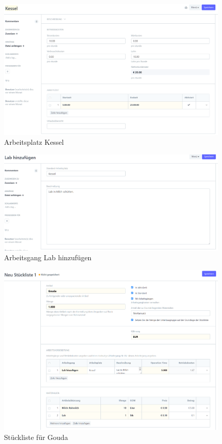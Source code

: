 \begin{figure}[H]
  \centering
  \includegraphics[width=\textwidth]{Bilder/Arbeitsplatz.PNG}
  \caption{Arbeitsplatz \glqq Kessel\grqq}
  \label{fig:arbPlatz}
\end{figure}
\begin{figure}[H]
  \centering
  \includegraphics[width=\textwidth]{Bilder/Arbeitsgang.PNG}
  \caption{Arbeitsgang \glqq Lab hinzufügen\grqq}
  \label{fig:arbGang}
\end{figure}
\begin{figure}[H]
  \centering
  \includegraphics[width=\textwidth]{Bilder/Stueckliste.PNG}
  \caption{Stückliste für Gouda}
  \label{fig:stListe}
\end{figure}
